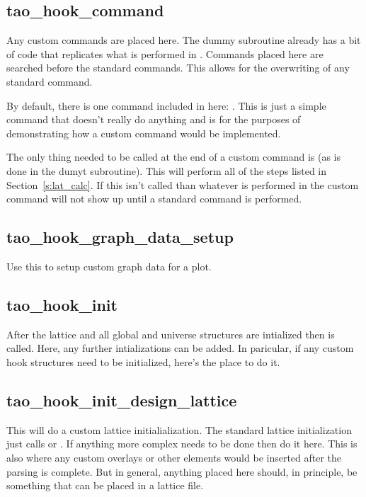 \subsection{tao\_hook\_command}

Any custom commands are placed here. The dummy subroutine already has a bit of
code that replicates what is performed in . Commands placed here
are searched before the standard \tao commands. This allows for the overwriting
of any standard \tao command.

By default, there is one command included in here: . This is just a
simple command that doesn't really do anything and is for the purposes of
demonstrating how a custom command would be implemented.

The only thing needed to be called at the end of a custom command is
 (as is done in the dumyt subroutine). This will perform
all of the steps listed in Section~\ref{s:lat_calc}. If this isn't called than
whatever is performed in the custom command will not show up until a standard
command is performed.

\subsection{tao\_hook\_graph\_data\_setup}

Use this to setup custom graph data for a plot.

\subsection{tao\_hook\_init}

After the lattice and all global and universe structures are intialized then
 is called. Here, any further intializations can be added. In
paricular, if any custom hook structures need to be initialized, here's the
place to do it.

\subsection{tao\_hook\_init\_design\_lattice}

This will do a custom lattice initialialization. The standard lattice
initialization just calls  or . If anything more
complex needs to be done then do it here. This is also where any custom overlays
or other elements would be inserted after the parsing is complete. But in
general, anything placed here should, in principle, be something that can be
placed in a lattice file. 

